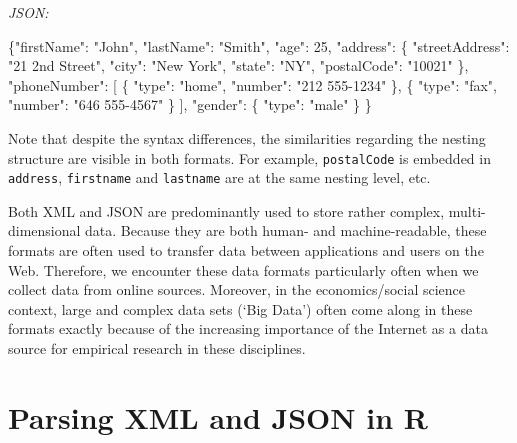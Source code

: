 \documentclass[
  12pt,
]{style/krantz}
\newenvironment{Shaded}{\begin{snugshade}}{\end{snugshade}}
\newcommand{\DataTypeTok}[1]{\textcolor[rgb]{0.13,0.29,0.53}{#1}}
\newcommand{\DecValTok}[1]{\textcolor[rgb]{0.00,0.00,0.81}{#1}}
\newcommand{\FunctionTok}[1]{\textcolor[rgb]{0.00,0.00,0.00}{#1}}
\newcommand{\OtherTok}[1]{\textcolor[rgb]{0.56,0.35,0.01}{#1}}
\newcommand{\StringTok}[1]{\textcolor[rgb]{0.31,0.60,0.02}{#1}}
\begin{document}
\emph{JSON:}

\begin{Shaded}
\begin{Highlighting}[]
\FunctionTok{\{}\DataTypeTok{"firstName"}\FunctionTok{:} \StringTok{"John"}\FunctionTok{,}
  \DataTypeTok{"lastName"}\FunctionTok{:} \StringTok{"Smith"}\FunctionTok{,}
  \DataTypeTok{"age"}\FunctionTok{:} \DecValTok{25}\FunctionTok{,}
  \DataTypeTok{"address"}\FunctionTok{:} \FunctionTok{\{}
    \DataTypeTok{"streetAddress"}\FunctionTok{:} \StringTok{"21 2nd Street"}\FunctionTok{,}
    \DataTypeTok{"city"}\FunctionTok{:} \StringTok{"New York"}\FunctionTok{,}
    \DataTypeTok{"state"}\FunctionTok{:} \StringTok{"NY"}\FunctionTok{,}
    \DataTypeTok{"postalCode"}\FunctionTok{:} \StringTok{"10021"}
  \FunctionTok{\},}
  \DataTypeTok{"phoneNumber"}\FunctionTok{:} \OtherTok{[}
    \FunctionTok{\{}
      \DataTypeTok{"type"}\FunctionTok{:} \StringTok{"home"}\FunctionTok{,}
      \DataTypeTok{"number"}\FunctionTok{:} \StringTok{"212 555{-}1234"}
    \FunctionTok{\}}\OtherTok{,}
    \FunctionTok{\{}
      \DataTypeTok{"type"}\FunctionTok{:} \StringTok{"fax"}\FunctionTok{,}
      \DataTypeTok{"number"}\FunctionTok{:} \StringTok{"646 555{-}4567"}
    \FunctionTok{\}}
  \OtherTok{]}\FunctionTok{,}
  \DataTypeTok{"gender"}\FunctionTok{:} \FunctionTok{\{}
    \DataTypeTok{"type"}\FunctionTok{:} \StringTok{"male"}
  \FunctionTok{\}}
\FunctionTok{\}}
\end{Highlighting}
\end{Shaded}

Note that despite the syntax differences, the similarities regarding the nesting structure are visible in both formats. For example, \texttt{postalCode} is embedded in \texttt{address}, \texttt{firstname} and \texttt{lastname} are at the same nesting level, etc.

Both XML and JSON are predominantly used to store rather complex, multi-dimensional data. Because they are both human- and machine-readable, these formats are often used to transfer data between applications and users on the Web. Therefore, we encounter these data formats particularly often when we collect data from online sources. Moreover, in the economics/social science context, large and complex data sets (`Big Data') often come along in these formats exactly because of the increasing importance of the Internet as a data source for empirical research in these disciplines.

\hypertarget{parsing-xml-and-json-in-r}{%
\section{Parsing XML and JSON in R}\label{parsing-xml-and-json-in-r}}
\end{document}
